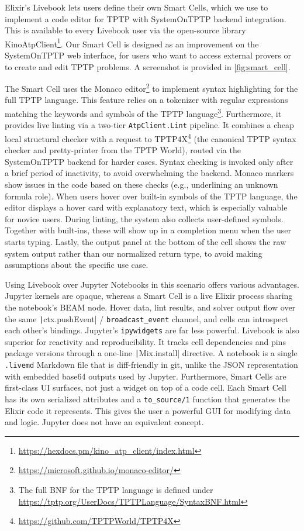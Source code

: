 \documentclass[]{ceurart}
\begin{document}
Elixir's Livebook lets users define their own Smart Cells, which we use to implement a code editor for TPTP with SystemOnTPTP backend integration. This is available to every Livebook user via the open-source library KinoAtpClient\footnote{\url{https://hexdocs.pm/kino_atp_client/index.html}}. Our Smart Cell is designed as an improvement on the SystemOnTPTP web interface, for users who want to access external provers or to create and edit TPTP problems. A screenshot is provided in \cref{fig:smart_cell}.

The Smart Cell uses the Monaco editor\footnote{\url{https://microsoft.github.io/monaco-editor/}} to implement syntax highlighting for the full TPTP language. This feature relies on a tokenizer with regular expressions matching the keywords and symbols of the TPTP language\footnote{The full BNF for the TPTP language is defined under \url{https://tptp.org/UserDocs/TPTPLanguage/SyntaxBNF.html}}. Furthermore, it provides live linting via a two-tier \texttt{AtpClient.Lint} pipeline. It combines a cheap local structural checker with a request to TPTP4X\footnote{\url{https://github.com/TPTPWorld/TPTP4X}} (the canonical TPTP syntax checker and pretty-printer from the TPTP World), routed via the SystemOnTPTP backend for harder cases. Syntax checking is invoked only after a brief period of inactivity, to avoid overwhelming the backend. Monaco markers show issues in the code based on these checks (e.g., underlining an unknown formula role). When users hover over built-in symbols of the TPTP language, the editor displays a hover card with explanatory text, which is especially valuable for novice users. During linting, the system also collects user-defined symbols. Together with built-ins, these will show up in a completion menu when the user starts typing. Lastly, the output panel at the bottom of the cell shows the raw system output rather than our normalized return type, to avoid making assumptions about the specific use case.

Using Livebook over Jupyter Notebooks in this scenario offers various advantages. Jupyter kernels are opaque, whereas a Smart Cell is a live Elixir process sharing the notebook's BEAM node. Hover data, lint results, and solver output flow over the same \texttt|ctx.pushEvent| / \texttt{broadcast_event} channel, and cells can introspect each other's bindings. Jupyter's \texttt{ipywidgets} are far less powerful. Livebook is also superior for reactivity and reproducibility. It tracks cell dependencies and pins package versions through a one-line \texttt|Mix.install| directive. A notebook is a single \texttt{.livemd} Markdown file that is diff-friendly in git, unlike the JSON representation with embedded base64 outputs used by Jupyter. Furthermore, Smart Cells are first-class UI surfaces, not just a widget on top of a code cell. Each Smart Cell has its own serialized attributes and a \texttt{to_source/1} function that generates the Elixir code it represents. This gives the user a powerful GUI for modifying data and logic. Jupyter does not have an equivalent concept.
\end{document}
